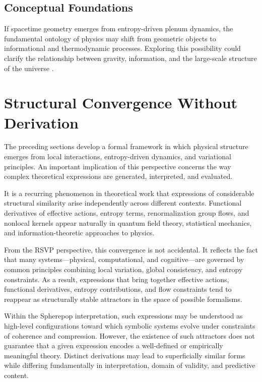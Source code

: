 \documentclass[12pt,a4paper]{article}
\theoremstyle{plain}
\theoremstyle{definition}
\theoremstyle{remark}
\begin{document}
\subsection{Conceptual Foundations}

If spacetime geometry emerges from entropy-driven plenum dynamics, the
fundamental ontology of physics may shift from geometric objects to
informational and thermodynamic processes. Exploring this possibility
could clarify the relationship between gravity, information, and the
large-scale structure of the universe \cite{Butterfield,Seiberg,
Penrose,Carroll2022}.

\section{Structural Convergence Without Derivation}
\label{sec:convergence}

The preceding sections develop a formal framework in which physical
structure emerges from local interactions, entropy-driven dynamics, and
variational principles. An important implication of this perspective
concerns the way complex theoretical expressions are generated,
interpreted, and evaluated.

It is a recurring phenomenon in theoretical work that expressions of
considerable structural similarity arise independently across different
contexts. Functional derivatives of effective actions, entropy terms,
renormalization group flows, and nonlocal kernels appear naturally in
quantum field theory, statistical mechanics, and information-theoretic
approaches to physics.

From the RSVP perspective, this convergence is not accidental. It
reflects the fact that many systems---physical, computational, and
cognitive---are governed by common principles combining local variation,
global consistency, and entropy constraints. As a result, expressions
that bring together effective actions, functional derivatives, entropy
contributions, and flow constraints tend to reappear as structurally
stable attractors in the space of possible formalisms.

Within the Spherepop interpretation, such expressions may be understood
as high-level configurations toward which symbolic systems evolve under
constraints of coherence and compression. However, the existence of
such attractors does not guarantee that a given expression encodes a
well-defined or empirically meaningful theory. Distinct derivations may
lead to superficially similar forms while differing fundamentally in
interpretation, domain of validity, and predictive content.
\end{document}
